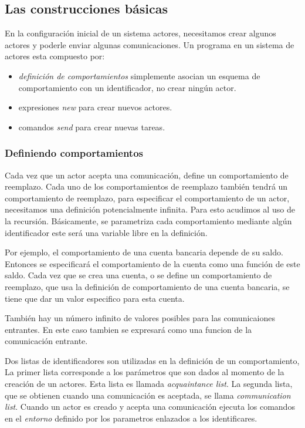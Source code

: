 \subsection{Las construcciones básicas}

En la configuración inicial de un sistema actores, necesitamos crear algunos actores y poderle enviar algunas comunicaciones. Un programa en un sistema de actores esta compuesto por:

\begin{itemize}
 \item \textit{definición de comportamientos} simplemente asocian un esquema de comportamiento con un identificador, no crear ningún actor.
 \item expresiones \textit{new} para crear nuevos actores.
 \item comandos \textit{send} para crear nuevas tareas.
\end{itemize}


\subsubsection*{Definiendo comportamientos}
Cada vez que un actor acepta una comunicación, define un comportamiento de reemplazo. Cada uno de los comportamientos de reemplazo también tendrá un comportamiento de reemplazo, para especificar el comportamiento de un actor, necesitamos una definición potencialmente infinita. Para esto acudimos al uso de la recursión. Básicamente, se parametriza cada comportamiento mediante algún identificador este será una variable libre en la definición. 

Por ejemplo, el comportamiento de una cuenta bancaria depende de su saldo. Entonces se especificará el comportamiento de la cuenta como una función de este saldo. Cada vez que se crea una cuenta, o se define un comportamiento de reemplazo, que usa la definición de comportamiento de una cuenta bancaria, se tiene que dar un valor especifico para esta cuenta.

También hay un número infinito de valores posibles para las comunicaiones entrantes. En este caso tambien se expresará como una funcion de la comunicación entrante.

Dos listas de identificadores son utilizadas en la definición de un comportamiento, La primer lista corresponde a los parámetros que son dados al momento de la creación de un actores. Esta lista es llamada \textit{acquaintance list}. La segunda lista, que se obtienen cuando una comunicación es aceptada, se llama \textit{communication list}. Cuando un actor es creado y acepta una comunicación ejecuta los comandos en el \textit{entorno} definido por los parametros enlazados a los identificares.

